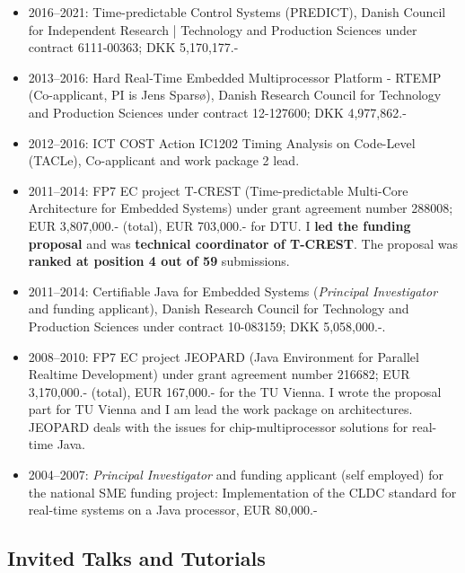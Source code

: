 \documentclass[%
    a4paper,
    11pt, %
    headinclude, footexclude,
    notitlepage,
    headsepline,
    pointlessnumbers,
    ]{scrartcl}
\begin{document}
\begin{itemize}

\item 2016--2021: Time-predictable Control Systems (PREDICT),
Danish Council for Independent Research | Technology and Production
  Sciences under contract 6111-00363; DKK 5,170,177.-
  
  \item 2013--2016: Hard Real-Time Embedded Multiprocessor Platform - RTEMP
  (Co-applicant, PI is Jens Spars{\o}), 
  Danish Research Council for Technology and Production
  Sciences under contract 12-127600; DKK 4,977,862.-
  
  \item 2012--2016: ICT COST Action IC1202 Timing Analysis on Code-Level (TACLe),
  Co-applicant and work package 2 lead.
  
  \item 2011--2014: FP7 EC project T-CREST (Time-predictable
  Multi-Core Architecture for Embedded Systems) under grant
  agreement number 288008; EUR 3,807,000.- (total), EUR 703,000.- for DTU.
  I \textbf{led the funding proposal} and was \textbf{technical coordinator of T-CREST}.
  The proposal was \textbf{ranked at position 4 out of 59} submissions.
  
  \item 2011--2014: Certifiable Java for Embedded Systems (\emph{Principal Investigator} and funding applicant),
   Danish Research Council for Technology and Production
   Sciences under contract 10-083159; DKK 5,058,000.-.
   
  \item 2008--2010: FP7 EC project JEOPARD (Java Environment for
      Parallel Realtime Development) under grant agreement number
      216682; EUR 3,170,000.- (total), EUR 167,000.- for the TU
      Vienna. I wrote the proposal part for TU Vienna and I am
      lead the work package on architectures. JEOPARD
      deals with the issues for chip-multiprocessor solutions for
      real-time Java.
      
  \item 2004--2007: \emph{Principal Investigator} and funding
      applicant (self employed) for the national SME funding
      project: Implementation of the CLDC standard for real-time
      systems on a Java processor, EUR 80,000.-
      
\end{itemize}

\subsection*{Invited Talks and Tutorials}
\end{document}

